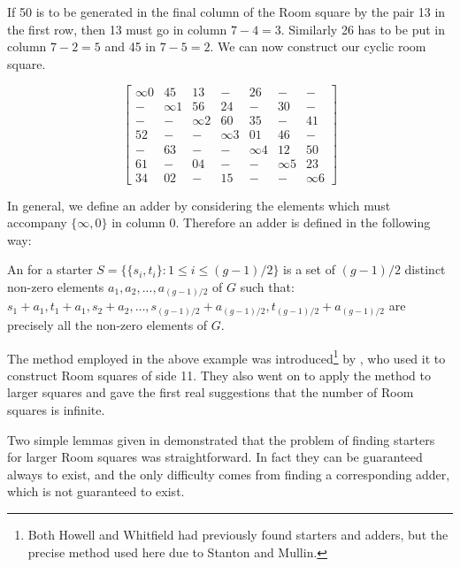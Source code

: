 If 50 is to be generated in the final column of the Room square by the pair 13 in the first row, then 13 must go in column $7 - 4 = 3$.
Similarly 26 has to be put in column $7 - 2 = 5$ and 45 in $7 - 5 = 2$.
We can now construct our cyclic room square.

\begin{equation}
  \begin{bmatrix}
    \infty 0 &  45 &  13 &   - &  26 &   - &   - \\
     - &  \infty 1 &  56 &  24 &   - &  30 &   - \\
     - &   - &  \infty 2 &  60 &  35 &   - &  41 \\
    52 &   - &   - &  \infty 3 &  01 &  46 &   - \\
     - &  63 &   - &   - &  \infty 4 &  12 &  50 \\
    61 &   - &  04 &   - &   - &  \infty 5 &  23 \\
    34 &  02 &   - &  15 &   - &   - &  \infty 6 
  \end{bmatrix}
  \label{eq:cyclic-room}
\end{equation}

In general, we define an adder by considering the elements which must accompany $\{\infty, 0\}$ in column 0.
Therefore an adder is defined in the following way:

An  for a starter
$S = \{\{s_i, t_i\}: 1 \leq i \leq (g - 1)/2 \}$
is a set of $(g - 1)/2$ distinct non-zero elements
$a_1, a_2, ..., a_{(g - 1)/2}$ of $G$ such that:
$s_1 + a_1, t_1 + a_1, s_2 + a_2, \ldots, s_{(g - 1)/2} + a_{(g - 1)/2}, t_{(g - 1)/2} + a_{(g - 1)/2}$
are precisely all the non-zero elements of $G$.

The  method employed in the above example was introduced\footnote{Both Howell and Whitfield had previously found starters and adders, but the precise method used here due to Stanton and Mullin.}
by
\cite{stantonConstructionRoomSquares1968},
who used it to construct Room squares of side 11.
They also went on to apply the method to larger squares and gave the first real suggestions that the number of Room squares is infinite.

Two simple lemmas given in
\cite{stantonConstructionRoomSquares1968}
demonstrated that the problem of finding starters for larger Room squares was straightforward.
In fact they can be guaranteed always to exist, and the only difficulty comes from finding a corresponding adder, which is not guaranteed to exist.

